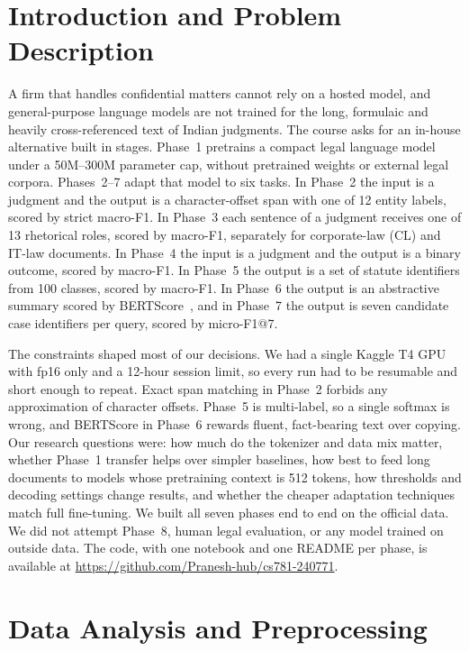 \documentclass[10pt,a4paper]{article}
\begin{document}
\section{Introduction and Problem Description}
A firm that handles confidential matters cannot rely on a hosted model, and general-purpose language models are not trained for the long, formulaic and heavily cross-referenced text of Indian judgments. The course asks for an in-house alternative built in stages. Phase~1 pretrains a compact legal language model under a 50M--300M parameter cap, without pretrained weights or external legal corpora. Phases~2--7 adapt that model to six tasks. In Phase~2 the input is a judgment and the output is a character-offset span with one of 12 entity labels, scored by strict macro-F1. In Phase~3 each sentence of a judgment receives one of 13 rhetorical roles, scored by macro-F1, separately for corporate-law (CL) and IT-law documents. In Phase~4 the input is a judgment and the output is a binary outcome, scored by macro-F1. In Phase~5 the output is a set of statute identifiers from 100 classes, scored by macro-F1. In Phase~6 the output is an abstractive summary scored by BERTScore~\cite{bertscore}, and in Phase~7 the output is seven candidate case identifiers per query, scored by micro-F1@7.

The constraints shaped most of our decisions. We had a single Kaggle T4 GPU with fp16 only and a 12-hour session limit, so every run had to be resumable and short enough to repeat. Exact span matching in Phase~2 forbids any approximation of character offsets. Phase~5 is multi-label, so a single softmax is wrong, and BERTScore in Phase~6 rewards fluent, fact-bearing text over copying. Our research questions were: how much do the tokenizer and data mix matter, whether Phase~1 transfer helps over simpler baselines, how best to feed long documents to models whose pretraining context is 512 tokens, how thresholds and decoding settings change results, and whether the cheaper adaptation techniques match full fine-tuning. We built all seven phases end to end on the official data. We did not attempt Phase~8, human legal evaluation, or any model trained on outside data. The code, with one notebook and one README per phase, is available at \url{https://github.com/Pranesh-hub/cs781-240771}.

\section{Data Analysis and Preprocessing}
\end{document}
